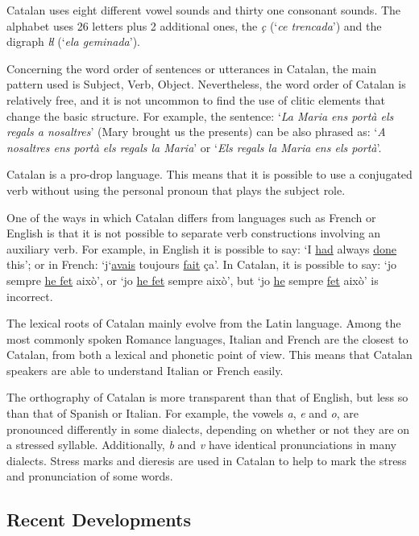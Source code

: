 \begin{multicols}{2}
Catalan uses eight different vowel sounds and thirty one consonant sounds. The alphabet uses 26 letters plus 2 additional ones, the \textit{ç} (‘\textit{ce trencada}’) and the digraph \textit{ŀl} (‘\textit{ela geminada}’).


Concerning the word order of sentences or utterances in Catalan, the main pattern used is Subject, Verb, Object. Nevertheless, the word order of Catalan is relatively free, and it is not uncommon to find the use of clitic elements that change the basic structure. For example, the sentence: ‘\textit{La Maria ens portà els regals a nosaltres}’ (Mary brought us the presents) can be also phrased as: ‘\textit{A nosaltres ens portà els regals la Maria}’ or ‘\textit{Els regals la Maria ens els portà}’.

Catalan is a pro-drop language. This means that it is possible to use a conjugated verb without using the personal pronoun that plays the subject role.

One of the ways in which Catalan differs from languages such as  French or English is that it is not possible to separate verb constructions involving an auxiliary verb. For example, in English it is possible to say: ‘I \underline{had} always \underline{done} this’; or in French: ‘j‘\underline{avais} toujours \underline{fait} ça’. In Catalan, it is possible to say: ‘jo sempre \underline{he fet} això’, or ‘jo \underline{he fet} sempre això’, but ‘jo \underline{he} sempre \underline{fet} això’ is incorrect.

The lexical roots of Catalan mainly evolve from the Latin language. Among the most commonly spoken Romance languages, Italian and French are the closest to Catalan, from both a lexical and phonetic point of view. This means that Catalan speakers are able to understand Italian or French easily.

The orthography of Catalan is more transparent than that of English, but less so than that of Spanish or Italian. For example, the vowels \textit{a}, \textit{e} and \textit{o}, are pronounced differently in some dialects, depending on whether or not they are on a stressed syllable. Additionally, \textit{b} and \textit{v} have identical pronunciations in many dialects. Stress marks and dieresis are used in Catalan to help to mark the stress and pronunciation of some words.

\subsection{Recent Developments}


\end{multicols}
